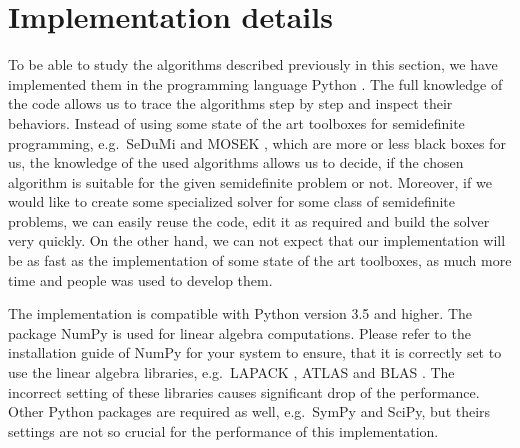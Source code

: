 \section{Implementation details}
To be able to study the algorithms described previously in this section, we have implemented them in the programming language Python \cite{python}.
The full knowledge of the code allows us to trace the algorithms step by step and inspect their behaviors.
Instead of using some state of the art toolboxes for semidefinite programming, e.g.\ SeDuMi \cite{sedumi} and MOSEK \cite{mosek}, which are more or less black boxes for us, the knowledge of the used algorithms allows us to decide, if the chosen algorithm is suitable for the given semidefinite problem or not.
Moreover, if we would like to create some specialized solver for some class of semidefinite problems, we can easily reuse the code, edit it as required and build the solver very quickly.
On the other hand, we can not expect that our implementation will be as fast as the implementation of some state of the art toolboxes, as much more time and people was used to develop them.

The implementation is compatible with Python version 3.5 and higher.
The package NumPy is used for linear algebra computations.
Please refer to the installation guide of NumPy for your system to ensure, that it is correctly set to use the linear algebra libraries, e.g.\ LAPACK \cite{lapack}, ATLAS \cite{atlas} and BLAS \cite{blas}.
The incorrect setting of these libraries causes significant drop of the performance.
Other Python packages are required as well, e.g.\ SymPy and SciPy, but theirs settings are not so crucial for the performance of this implementation.

